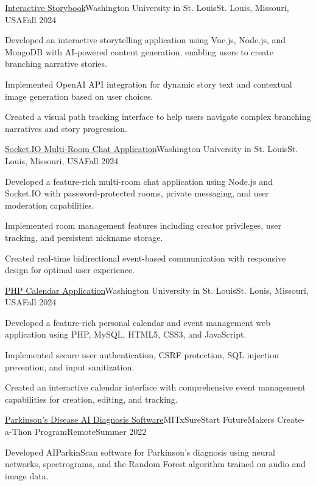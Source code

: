 \begin{projectentry}{\href{https://github.com/agopalareddy/CSE503S_Interactive_Storybook}{Interactive Storybook}}{Washington University in St. Louis}{St. Louis, Missouri, USA}{Fall 2024}
    \item Developed an interactive storytelling application using Vue.js, Node.js, and MongoDB with AI-powered content generation, enabling users to create branching narrative stories.
    \item Implemented OpenAI API integration for dynamic story text and contextual image generation based on user choices.
    \item Created a visual path tracking interface to help users navigate complex branching narratives and story progression.
\end{projectentry}
\begin{projectentry}{\href{https://github.com/agopalareddy/CSE503S_Chat_App}{Socket.IO Multi-Room Chat Application}}{Washington University in St. Louis}{St. Louis, Missouri, USA}{Fall 2024}
    \item Developed a feature-rich multi-room chat application using Node.js and Socket.IO with password-protected rooms, private messaging, and user moderation capabilities.
    \item Implemented room management features including creator privileges, user tracking, and persistent nickname storage.
    \item Created real-time bidirectional event-based communication with responsive design for optimal user experience.
\end{projectentry}

\begin{projectentry}{\href{https://github.com/agopalareddy/CSE503S_PHP_Calendar_App}{PHP Calendar Application}}{Washington University in St. Louis}{St. Louis, Missouri, USA}{Fall 2024}
    \item Developed a feature-rich personal calendar and event management web application using PHP, MySQL, HTML5, CSS3, and JavaScript.
    \item Implemented secure user authentication, CSRF protection, SQL injection prevention, and input sanitization.
    \item Created an interactive calendar interface with comprehensive event management capabilities for creation, editing, and tracking.
\end{projectentry}

\begin{projectentry}{\href{https://github.com/agopalareddy/AIPS}{Parkinson's Disease AI Diagnosis Software}}{MITxSureStart FutureMakers Create-a-Thon Program}{Remote}{Summer 2022}
    \item Developed AIParkinScan software for Parkinson's diagnosis using neural networks, spectrograms, and the Random Forest algorithm trained on audio and image data.
\end{projectentry}


